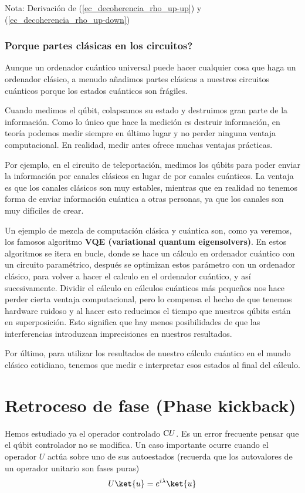 \documentclass[a4paper,11pt]{book} %
\numberwithin{equation}{chapter}
\newcommand{\cg}[1]{{\rm C}#1}
\begin{document}
\begin{mybox_blue}{Nota: Derivación de (\ref{ec_decoherencia_rho_up-up}) y  (\ref{ec_decoherencia_rho_up-down})}
		\subsubsection{Porque partes clásicas en los circuitos?}
		
Aunque un ordenador cuántico universal puede hacer cualquier cosa que haga un ordenador clásico, a menudo añadimos partes clásicas a nuestros circuitos cuánticos porque los estados cuánticos son frágiles.

Cuando medimos el qúbit, colapsamos su estado y destruimos gran parte de la información. Como lo único que hace la medición es destruir información, en teoría podemos medir siempre en último lugar y no perder ninguna ventaja computacional. En realidad, medir antes ofrece muchas ventajas prácticas.

Por ejemplo, en el circuito de teleportación, medimos los qúbits para poder enviar la información por canales clásicos en lugar de por canales cuánticos. La ventaja es que los canales clásicos son muy estables, mientras que en realidad no tenemos forma de enviar información cuántica a otras personas, ya que los canales son muy difíciles de crear.

Un ejemplo de mezcla de computación clásica y cuántica son, como ya veremos, los famosos algoritmo \textbf{VQE (variational quantum eigensolvers)}. En estos algoritmos se itera en bucle, donde se hace un cálculo en ordenador cuántico con un circuito paramétrico, después se optimizan estos parámetro con un ordenador clásico, para volver a hacer el calculo en el ordenador cuántico, y así sucesivamente.  Dividir el cálculo en cálculos cuánticos más pequeños nos hace perder cierta ventaja computacional, pero lo compensa el hecho de que tenemos hardware ruidoso y al hacer esto reducimos el tiempo que nuestros qúbits están en superposición. Esto significa que hay menos posibilidades de que las interferencias introduzcan imprecisiones en nuestros resultados.

Por último, para utilizar los resultados de nuestro cálculo cuántico en el mundo clásico cotidiano, tenemos que medir e interpretar esos estados al final del cálculo.




    \section{Retroceso de fase (Phase kickback)}

Hemos estudiado ya el operador controlado $\cg{U}$. Es un error frecuente pensar que el qúbit controlador no se modifica. Un caso importante ocurre cuando el operador $U$ actúa sobre uno de sus autoestados (recuerda que los autovalores de  un operador unitario son fases puras)
	\begin{equation} \label{ec_elementos_U_sobre_eigen}
	U\ket{u} = e^{i\lambda} \ket{u}
	\end{equation}


\end{mybox_blue}
\end{document}

